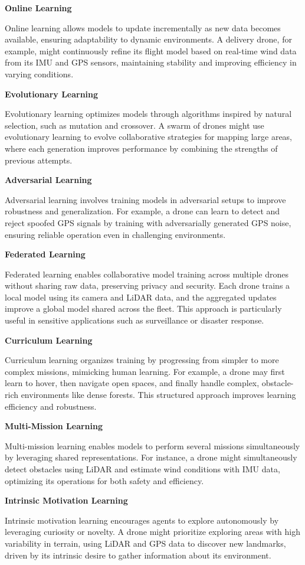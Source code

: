 \documentclass{book}
\providecommand{\ProjectDeepHeading}[2]{%
    \par\medskip\noindent\textbf{#2}\par\smallskip
}
\begin{document}
\ProjectDeepHeading{3}{Online Learning}
Online learning allows models to update incrementally as new data becomes available, ensuring adaptability to dynamic environments. A delivery drone, for example, might continuously refine its flight model based on real-time wind data from its IMU and GPS sensors, maintaining stability and improving efficiency in varying conditions. 

\ProjectDeepHeading{3}{Evolutionary Learning}
Evolutionary learning optimizes models through algorithms inspired by natural selection, such as mutation and crossover. A swarm of drones might use evolutionary learning to evolve collaborative strategies for mapping large areas, where each generation improves performance by combining the strengths of previous attempts. 

\ProjectDeepHeading{3}{Adversarial Learning}
Adversarial learning involves training models in adversarial setups to improve robustness and generalization. For example, a drone can learn to detect and reject spoofed GPS signals by training with adversarially generated GPS noise, ensuring reliable operation even in challenging environments. 

\ProjectDeepHeading{3}{Federated Learning}
Federated learning enables collaborative model training across multiple drones without sharing raw data, preserving privacy and security. Each drone trains a local model using its camera and LiDAR data, and the aggregated updates improve a global model shared across the fleet. This approach is particularly useful in sensitive applications such as surveillance or disaster response. 

\ProjectDeepHeading{3}{Curriculum Learning}
Curriculum learning organizes training by progressing from simpler to more complex missions, mimicking human learning. For example, a drone may first learn to hover, then navigate open spaces, and finally handle complex, obstacle-rich environments like dense forests. This structured approach improves learning efficiency and robustness.

\ProjectDeepHeading{3}{Multi-Mission Learning}
Multi-mission learning enables models to perform several missions simultaneously by leveraging shared representations. For instance, a drone might simultaneously detect obstacles using LiDAR and estimate wind conditions with IMU data, optimizing its operations for both safety and efficiency.

\ProjectDeepHeading{3}{Intrinsic Motivation Learning}
Intrinsic motivation learning encourages agents to explore autonomously by leveraging curiosity or novelty. A drone might prioritize exploring areas with high variability in terrain, using LiDAR and GPS data to discover new landmarks, driven by its intrinsic desire to gather information about its environment. 
\end{document}
